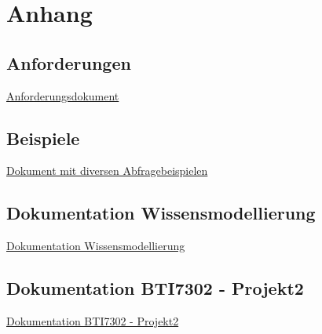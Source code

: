 \chapter*{Anhang}
\label{chap:anhang}


\appendix

\section*{Anforderungen}
\label{sec:anhang:anforderungen}
\href{anhang/anforderungen.pdf}{Anforderungsdokument}

\section*{Beispiele}
\label{sec:anhang:sparql_beispiele}
\href{anhang/schnipsel.pdf}{Dokument mit diversen Abfragebeispielen}

\section*{Dokumentation Wissensmodellierung}
\label{sec:anhang:tutorial_dokument}
\href{../Tutorial/template.pdf}{Dokumentation Wissensmodellierung}

\section*{Dokumentation BTI7302 - Projekt2}
\label{sec:anhang:projekt2}
\href{../Extern/EigeneDokumente/DokumentationProjekt2.pdf}{Dokumentation BTI7302 - Projekt2}
